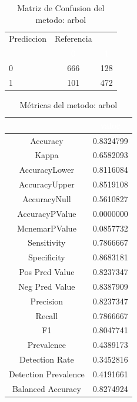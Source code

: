\documentclass[]{article}
\begin{document}
\begin{table}[!h]

\caption{\label{tab:MatrizConf_arbol}Matriz de Confusion del metodo: arbol }
\centering
\begin{tabular}[t]{lcc}
\toprule
\multicolumn{1}{c}{Prediccion} & \multicolumn{1}{c}{Referencia} & \multicolumn{1}{c}{ } \\
\cmidrule(l{3pt}r{3pt}){1-1} \cmidrule(l{3pt}r{3pt}){2-2}
\rowcolor{black}  \multicolumn{1}{c}{\textcolor{white}{\textbf{ }}} & \multicolumn{1}{c}{\textcolor{white}{\textbf{0}}} & \multicolumn{1}{c}{\textcolor{white}{\textbf{1}}}\\
\midrule
\rowcolor{gray!6}  0 & 666 & 128\\
1 & 101 & 472\\
\bottomrule
\end{tabular}
\end{table}

\begin{table}[!h]

\caption{\label{tab:metricas_arbol}Métricas del metodo: arbol }
\centering
\begin{tabular}[t]{cc}
\toprule
\rowcolor{black}  \multicolumn{1}{c}{\textcolor{white}{\textbf{metricas}}} & \multicolumn{1}{c}{\textcolor{white}{\textbf{valor}}}\\
\midrule
\rowcolor{gray!6}  Accuracy & 0.8324799\\
Kappa & 0.6582093\\
\rowcolor{gray!6}  AccuracyLower & 0.8116084\\
AccuracyUpper & 0.8519108\\
\rowcolor{gray!6}  AccuracyNull & 0.5610827\\
\addlinespace
AccuracyPValue & 0.0000000\\
\rowcolor{gray!6}  McnemarPValue & 0.0857732\\
Sensitivity & 0.7866667\\
\rowcolor{gray!6}  Specificity & 0.8683181\\
Pos Pred Value & 0.8237347\\
\addlinespace
\rowcolor{gray!6}  Neg Pred Value & 0.8387909\\
Precision & 0.8237347\\
\rowcolor{gray!6}  Recall & 0.7866667\\
F1 & 0.8047741\\
\rowcolor{gray!6}  Prevalence & 0.4389173\\
\addlinespace
Detection Rate & 0.3452816\\
\rowcolor{gray!6}  Detection Prevalence & 0.4191661\\
Balanced Accuracy & 0.8274924\\
\bottomrule
\end{tabular}
\end{table}
\end{document}
